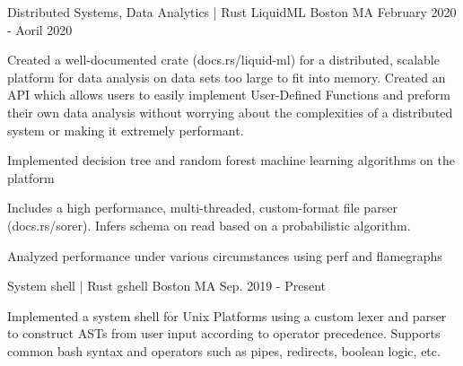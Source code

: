 

\begin{cventries}
    \cventry
    {Distributed Systems, Data Analytics | Rust} %
    {LiquidML} %
    {Boston MA} %
    {February 2020 - Aoril 2020} %
    {
      \begin{cvitems} %
        \item {Created a well-documented crate (docs.rs/liquid-ml) for a distributed,  scalable platform for data analysis on data sets too large to fit into memory. Created an API which allows users to easily implement User-Defined Functions and preform their own data analysis without worrying about the complexities of a distributed system or making it extremely performant.}
        \item {Implemented decision tree and random forest machine learning algorithms on the platform}
        \item {Includes a high performance, multi-threaded, custom-format file parser (docs.rs/sorer). Infers schema on read based on a probabilistic algorithm.}
        \item {Analyzed performance under various circumstances using perf and flamegraphs}
      \end{cvitems}
    }

    \cventry
    {System shell | Rust} %
    {gshell} %
    {Boston MA} %
    {Sep. 2019 - Present} %
    {
      \begin{cvitems} %
        \item {Implemented a system shell for Unix Platforms using a custom lexer and parser to construct ASTs from user input according to operator precedence. Supports common bash syntax and operators such as pipes, redirects, boolean logic, etc.}
      \end{cvitems}
    }

\end{cventries}
